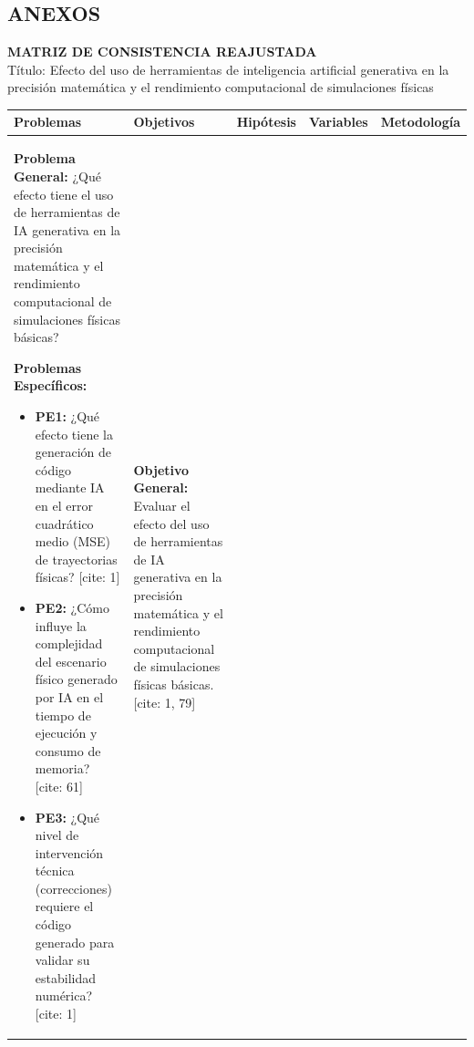 \begin{landscape}
\thispagestyle{empty}

\section*{ANEXOS}

\begin{center}
    \textbf{\Large MATRIZ DE CONSISTENCIA REAJUSTADA} \\
    \vspace{0.2cm}
    \small Título: Efecto del uso de herramientas de inteligencia artificial generativa en la precisión matemática y el rendimiento computacional de simulaciones físicas
\end{center}

\vspace{0.3cm}

\noindent
\begin{tabularx}{\linewidth}{|Y|Y|Y|Y|Y|}
\hline
{} 
\textbf{Problemas} & \textbf{Objetivos} & \textbf{Hipótesis} & \textbf{Variables} & \textbf{Metodología} \\ \hline

\textbf{Problema General:} \newline
¿Qué efecto tiene el uso de herramientas de IA generativa en la precisión matemática y el rendimiento computacional de simulaciones físicas básicas?  \newline

\textbf{Problemas Específicos:}
\begin{itemize}[leftmargin=*, nosep, itemsep=6pt]
    \item \textbf{PE1:} ¿Qué efecto tiene la generación de código mediante IA en el error cuadrático medio (MSE) de trayectorias físicas? [cite: 1]
    \item \textbf{PE2:} ¿Cómo influye la complejidad del escenario físico generado por IA en el tiempo de ejecución y consumo de memoria? [cite: 61]
    \item \textbf{PE3:} ¿Qué nivel de intervención técnica (correcciones) requiere el código generado para validar su estabilidad numérica? [cite: 1]
\end{itemize} 
& 
\textbf{Objetivo General:} \newline
Evaluar el efecto del uso de herramientas de IA generativa en la precisión matemática y el rendimiento computacional de simulaciones físicas básicas. [cite: 1, 79] \newline


\end{tabularx}
\end{landscape}

